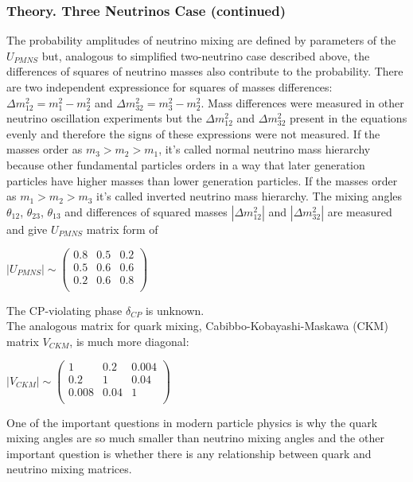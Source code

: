 \begin{frame}\frametitle{Theory. Three Neutrinos Case (continued)}
  \tiny
  The probability amplitudes of neutrino mixing are defined by parameters of the $U_{PMNS}$ but, analogous to simplified two-neutrino case described above, the differences of squares of neutrino masses also contribute to the probability. There are two independent expressionce for squares of masses differences: ${\Delta}m_{12}^2 = m_1^2-m_2^2$ and ${\Delta}m_{32}^2 = m_3^2-m_2^2$. Mass differences were measured in other neutrino oscillation experiments but the ${\Delta}m_{12}^2$ and ${\Delta}m_{32}^2$ present in the equations evenly and therefore the signs of these expressions were not measured. If the masses order as $m_3 > m_2 > m_1$, it's called normal neutrino mass hierarchy because other fundamental particles orders in a way that later generation particles have higher masses than lower generation particles. If the masses order as $m_1 > m_2 > m_3$ it's called inverted neutrino mass hierarchy. The mixing angles $\theta_{12}$, $\theta_{23}$, $\theta_{13}$ and differences of squared masses $|{\Delta}m_{12}^2|$ and $|{\Delta}m_{32}^2|$ are measured and give $U_{PMNS}$ matrix form of\\
  \begin{center}
  $|U_{PMNS}| \sim
  \begin{pmatrix}
  0.8 & 0.5 & 0.2 \\ 0.5 & 0.6 & 0.6 \\ 0.2 & 0.6 & 0.8 \\
  \end{pmatrix}$\\
  \end{center}
  The CP-violating phase $\delta_{CP}$ is unknown.\\
  The analogous matrix for quark mixing, Cabibbo-Kobayashi-Maskawa (CKM) matrix $V_{CKM}$, is much more diagonal:\\
  \begin{center}
  $|V_{CKM}| \sim
  \begin{pmatrix}
  1 & 0.2 & 0.004 \\ 0.2 & 1 & 0.04 \\ 0.008 & 0.04 & 1 \\
  \end{pmatrix}$\\
  \end{center}
  One of the important questions in modern particle physics is why the quark mixing angles are so much smaller than neutrino mixing angles and the other important question is whether there is any relationship between quark and neutrino mixing matrices.\\
\end{frame}

